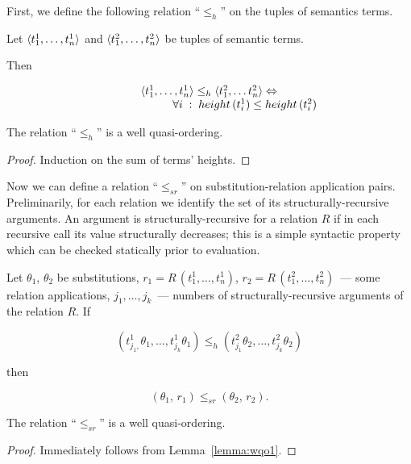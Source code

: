 First, we define the following relation ``$\leq_h$'' on the tuples of semantics terms.

\begin{definition}
  Let $\langle t_1^1, \dots, t_n^1 \rangle$ and $\langle t_1^2, \dots, t_n^2 \rangle$ be tuples of semantic terms. 

  Then

  \[
  \begin{array}{c}
  \langle t_1^1, \ldots, t_n^1 \rangle \leq_h \langle t_1^2, \ldots t_n^2 \rangle \Leftrightarrow\\
  \phantom{XXXXXXX}\forall i\;:\;height\,(t_i^1) \leq height\,(t_i^2)
  \end{array}
  \]
\end{definition}


\begin{lemma}
\label{lemma:wqo1}
The relation ``$\leq_h$'' is a well quasi-ordering.
\end{lemma}
\begin{proof}
  Induction on the sum of terms' heights.
\end{proof}

Now we can define a relation ``$\leq_{sr}$''  on substitution-relation application pairs. Preliminarily, for each relation we
identify the set of its structurally-recursive arguments. An argument is structurally-recursive for a relation $R$ if in
each recursive call its value structurally decreases; this is a simple syntactic property which can be checked statically
prior to evaluation.

\begin{definition}
  Let $\theta_1$, $\theta_2$ be substitutions, \mbox{$r_1=R\,(t^1_1,\dots,t^1_n)$}, \mbox{$r_2=R\,(t^2_1,\dots,t^2_n)$}~--- some relation applications, $j_1, \dots, j_k$~---
  numbers of structurally-recursive arguments of the relation $R$. If

  \[
  (t^1_{j_1,}\theta_1,  \dots,  t^1_{j_k}\theta_1) \leq_h (t^2_{j_1}\theta_2, \dots, t^2_{j_k}\theta_2)
  \]

  then
  
  \[
  (\theta_1,\, r_1) \leq_{sr} (\theta_2,\, r_2).
  \]
\end{definition}

\begin{lemma}
\label{lemma:sr-wqo}
The relation ``$\leq_{sr}$'' is a well quasi-ordering.
\end{lemma}
\begin{proof}
  Immediately follows from Lemma~\ref{lemma:wqo1}.
\end{proof}

